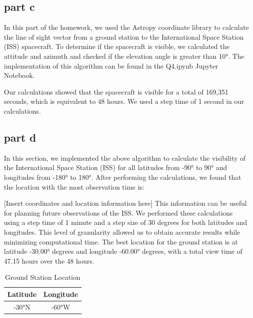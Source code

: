 \subsection{part c}
In this part of the homework, we used the Astropy coordinate library to calculate the line of sight vector from a ground station to the International Space Station (ISS) spacecraft. To determine if the spacecraft is visible, we calculated the attitude and azimuth and checked if the elevation angle is greater than \ang{10}. The implementation of this algorithm can be found in the Q4.ipynb Jupyter Notebook.

Our calculations showed that the spacecraft is visible for a total of 169,351 seconds, which is equivalent to 48 hours. We used a step time of 1 second in our calculations.

\subsection{part d}
In this section, we implemented the above algorithm to calculate the visibility of the International Space Station (ISS) for all latitudes from \ang{-90} to \ang{90} and longitudes from \ang{-180} to \ang{180}. After performing the calculations, we found that the location with the most observation time is:

[Insert coordinates and location information here]
This information can be useful for planning future observations of the ISS. We performed these calculations using a step time of 1 minute and a step size of 30 degrees for both latitudes and longitudes. This level of granularity allowed us to obtain accurate results while minimizing computational time.
The best location for the ground station is at latitude \ang{-30.00} degrees and longitude \ang{-60.00} degrees, with a total view time of 47.15 hours over the 48 hours.
\begin{table}[H]
    \centering
    \label{table:lat-long}
    \begin{tabular}{|c|c|}
    \hline
    Latitude & Longitude \\
    \hline
    \ang{-30}N & \ang{-60}W \\
    \hline
    \end{tabular}
    \caption{Ground Station Location}
\end{table}